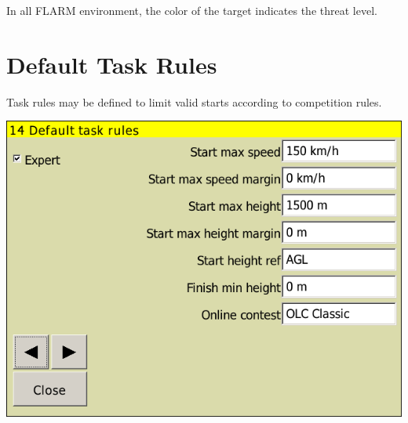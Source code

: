 \documentclass[a4paper,12pt]{refrep}
\begin{document}
In all FLARM environment, the color of the target indicates the threat level.


\clearpage
\section{Default Task Rules}
Task rules may be defined to limit valid starts according to competition
rules. \label{conf:taskrules}

\begin{center}
\includegraphics[angle=0,width=\linewidth,keepaspectratio='true']{figures/config-rules.png}
\end{center}
\end{document}

